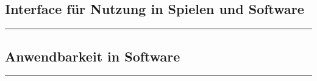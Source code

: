 \hypertarget{interface-fuxfcr-nutzung-in-spielen-und-software}{%
\subsection{Interface für Nutzung in Spielen und
Software}\label{interface-fuxfcr-nutzung-in-spielen-und-software}}

\begin{center}\rule{0.5\linewidth}{0.5pt}\end{center}

\hypertarget{anwendbarkeit-in-software}{%
\subsection{Anwendbarkeit in Software}\label{anwendbarkeit-in-software}}

\begin{center}\rule{0.5\linewidth}{0.5pt}\end{center}
